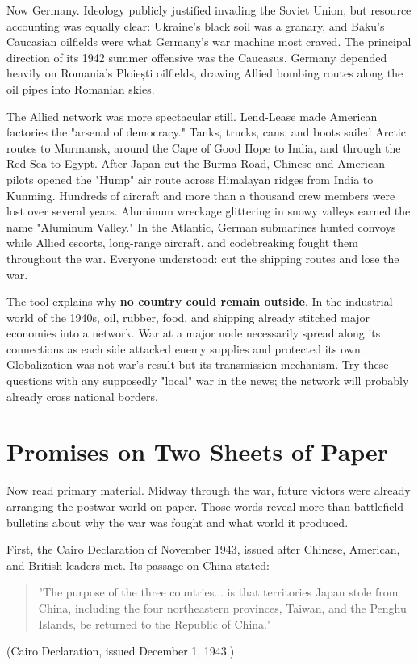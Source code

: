 Now Germany. Ideology publicly justified invading the Soviet Union, but resource accounting was equally clear: Ukraine's black soil was a granary, and Baku's Caucasian oilfields were what Germany's war machine most craved. The principal direction of its 1942 summer offensive was the Caucasus. Germany depended heavily on Romania's Ploiești oilfields, drawing Allied bombing routes along the oil pipes into Romanian skies.

The Allied network was more spectacular still. Lend-Lease made American factories the "arsenal of democracy." Tanks, trucks, cans, and boots sailed Arctic routes to Murmansk, around the Cape of Good Hope to India, and through the Red Sea to Egypt. After Japan cut the Burma Road, Chinese and American pilots opened the "Hump" air route across Himalayan ridges from India to Kunming. Hundreds of aircraft and more than a thousand crew members were lost over several years. Aluminum wreckage glittering in snowy valleys earned the name "Aluminum Valley." In the Atlantic, German submarines hunted convoys while Allied escorts, long-range aircraft, and codebreaking fought them throughout the war. Everyone understood: cut the shipping routes and lose the war.

The tool explains why \textbf{no country could remain outside}. In the industrial world of the 1940s, oil, rubber, food, and shipping already stitched major economies into a network. War at a major node necessarily spread along its connections as each side attacked enemy supplies and protected its own. Globalization was not war's result but its transmission mechanism. Try these questions with any supposedly "local" war in the news; the network will probably already cross national borders.

\section{Promises on Two Sheets of Paper}
Now read primary material. Midway through the war, future victors were already arranging the postwar world on paper. Those words reveal more than battlefield bulletins about why the war was fought and what world it produced.

First, the Cairo Declaration of November 1943, issued after Chinese, American, and British leaders met. Its passage on China stated:

\begin{quote}
"The purpose of the three countries... is that territories Japan stole from China, including the four northeastern provinces, Taiwan, and the Penghu Islands, be returned to the Republic of China."
\end{quote}
(Cairo Declaration, issued December 1, 1943.)

